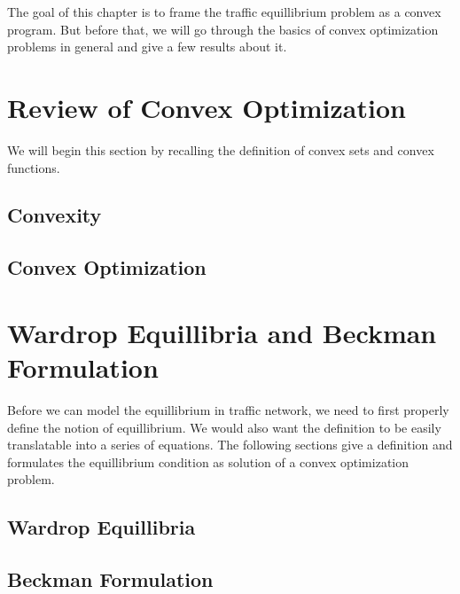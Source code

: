 The goal of this chapter is to  frame the traffic equillibrium problem as a convex program. But before that, we will go through the basics of convex optimization problems in general and give a few
results about it.

\section{Review of Convex Optimization}
We will begin this section by recalling the definition of convex sets and convex functions.

\subsection{Convexity}


\subsection{Convex Optimization}

	
\section{Wardrop Equillibria and Beckman Formulation}
Before we can model the equillibrium in traffic network, we need to first properly define the notion of equillibrium. We would also	want the definition to be easily translatable into a series of	equations. The following sections give a definition and formulates the equillibrium condition as solution of a	convex optimization problem.

\subsection{Wardrop Equillibria}

	
\subsection{Beckman Formulation}\label{sec:beckman}

